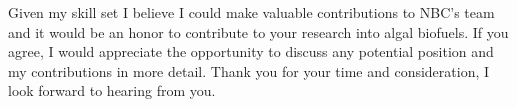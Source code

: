 \documentclass[11pt,a4paper,sans]{moderncv}
\begin{document}
\begin{spacing}{1.15}
Given my skill set I believe I could make valuable contributions to NBC's team and it would be an honor to contribute to your research into algal biofuels. 
If you agree, I would appreciate the opportunity to discuss any potential position and my contributions in more detail. 
Thank you for your time and consideration, I look forward to hearing from you.


 

\end{spacing}
\makeletterclosing
\end{document}
